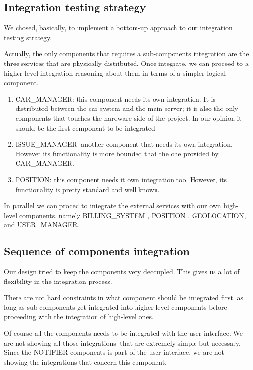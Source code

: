 \documentclass[11pt]{article} %
\begin{document}
\subsection{Integration testing strategy}

We chosed, basically, to implement a bottom-up approach to our integration testing strategy. 

Actually, the only components that requires a sub-components integration are the three services that are physically distributed. Once integrate, we can proceed to a higher-level integration reasoning about them in terms of a simpler logical component.

\begin{enumerate}
	\item CAR\_MANAGER: this component needs its own integration. It is distributed between the car system and the main server; it is also the only components that touches the hardware side of the project. In our opinion it should be the first component to be integrated.
	\item ISSUE\_MANAGER: another component that needs its own integration. However its functionality is more bounded that the one provided by CAR\_MANAGER.
	\item POSITION: this component needs it own integration too. However, its functionality is pretty standard and well known.
\end{enumerate}

In parallel we can proced to integrate the external services with our own high-level components, namely BILLING\_SYSTEM , POSITION , GEOLOCATION,  and  USER\_MANAGER.

\subsection{Sequence of components integration}

Our design tried to keep the components very decoupled. This gives us a lot of flexibility in the integration process.

There are not hard constraints in what component should be integrated first, as long as sub-components get integrated into higher-level components before proceeding with the integration of high-level ones.

Of course all the components needs to be integrated with the user interface. We are not showing all those integrations, that are extremely simple but necessary. Since the NOTIFIER components is part of the user interface, we are not showing the integrations that concern this component.
\end{document}
